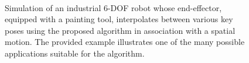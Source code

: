 \begin{figure}[tbp]
	\centering
    \hfill
    \\
    \hfill
    \caption{Simulation \cite{tasora2015chrono} of an industrial 6-DOF robot whose end-effector, equipped with a painting tool, interpolates between various key poses using the proposed algorithm in association with a spatial motion. The provided example illustrates one of the many possible applications suitable for the algorithm.}
    \label{fig:chrono_robot}
\end{figure}

